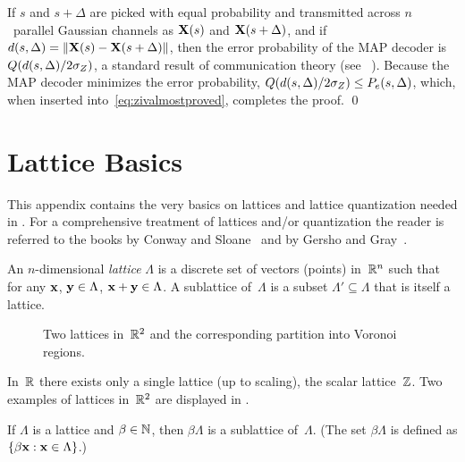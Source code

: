 \begin{subappendices}
  If $s$ and $s+\Delta$ are picked with equal probability and transmitted across
  $n$~parallel Gaussian channels as $\mathbf{X}(s)$ and $\mathbf{X}(s+\Delta)$, and if $d(s,
  \Delta) = \| \mathbf{X}(s) - \mathbf{X}(s + \Delta)\|$, then the error probability of the MAP
  decoder is $Q(d(s,\Delta) / 2 {\sigma_Z})$, a standard result of communication theory
  (see \eg~\cite[Section~4.5]{WozencraftJ1965}). Because the MAP decoder minimizes
  the error probability, $Q(d(s,\Delta)/2{\sigma_Z}) \le P_e(s,\Delta)$, which, when
  inserted into~\eqref{eq:zivalmostproved}, completes the proof. \hfill\qed



  \section{Lattice Basics}\label{app:latticebasics}

  This appendix contains the very basics on lattices and lattice quantization
  needed in . For a comprehensive treatment of
  lattices and/or quantization the reader is referred to the books by Conway and
  Sloane~\cite{ConwayS1988} and by Gersho and Gray~\cite{GershoG1992}.

  \begin{definition}
    An $n$-dimensional \emph{lattice} $\Lambda$ is a discrete set of vectors
    (points) in~$\mathbb{R}^n$ such that for any $\mathbf{x}$, $\mathbf{y} \in \Lambda$, $\mathbf{x} + \mathbf{y} \in
    \Lambda$. A sublattice of~$\Lambda$ is a subset $\Lambda' \subseteq \Lambda$
    that is itself a lattice. 
  \end{definition}

  \begin{figure}
    \centerline{%
    \hfil
    }
    \caption{Two lattices in~$\mathbb{R}^2$ and the corresponding partition into Voronoi
    regions.}
    \label{fig:r2lattices}
  \end{figure}

  \begin{example}
    \label{ex:scalarlattice}
    In~$\mathbb{R}$ there exists only a single lattice (up to scaling), the scalar
    lattice~$\mathbb{Z}$. Two examples of lattices in~$\mathbb{R}^2$ are displayed in
    .
  \end{example}

  \begin{proposition}
    \label{prop:intsublattice}
    If $\Lambda$ is a lattice and $\beta \in {\mathbb{N}}$, then $\beta \Lambda$ is a
    sublattice of~$\Lambda$. (The set $\beta \Lambda$ is defined as $\{ \beta \mathbf{x}
    : \mathbf{x} \in \Lambda\}$.)
  \end{proposition}


\end{subappendices}
